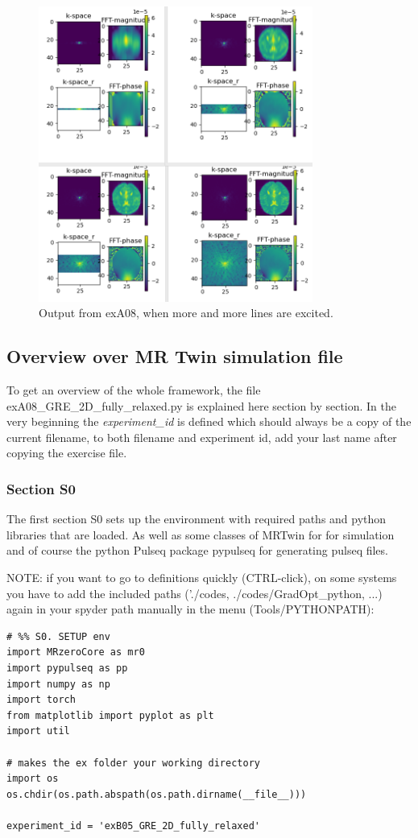 \documentclass[a4paper,12pt]{extarticle}
\begin{document}
\begin{figure}[!ht] 
\centering
\includegraphics[width=9cm]{img/exA08_2.PNG}
\caption{Output from exA08, when more and more lines are excited.} \label{fig:exA09_2}
\end{figure}

\newpage 

\subsection{Overview over MR Twin simulation file}

To get an overview of the whole framework, the file exA08\_GRE\_2D\_fully\_relaxed.py is explained here section by section. In the very beginning the \emph{experiment\_id} is defined which should always be a copy of the current filename, to both filename and experiment id, add your last name after copying the exercise file. 

\subsubsection{Section S0}
The first section S0 sets up the environment with required paths and python libraries that are loaded. As well as some classes of MRTwin for for simulation and of course the python Pulseq package pypulseq for generating pulseq files.

NOTE: if you want to go to definitions quickly (CTRL-click), on some systems you have to add the included paths ('./codes, ./codes/GradOpt\_python, ...)  again in your spyder path manually in the menu (Tools/PYTHONPATH):

\begin{verbatim}
# %% S0. SETUP env
import MRzeroCore as mr0
import pypulseq as pp
import numpy as np
import torch
from matplotlib import pyplot as plt
import util

# makes the ex folder your working directory
import os
os.chdir(os.path.abspath(os.path.dirname(__file__)))

experiment_id = 'exB05_GRE_2D_fully_relaxed'
\end{verbatim}
\end{document}
